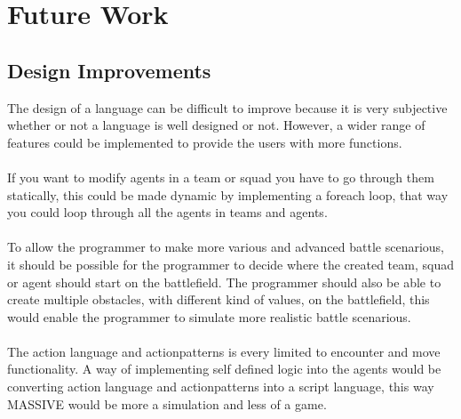 \section{Future Work}
\subsection{Design Improvements}
The design of a language can be difficult to improve because it is very subjective whether or not a language is well designed or not. However, a wider range of features could be implemented to provide the users with more functions.\\\\
\indent If you want to modify agents in a team or squad you have to go through them statically, this could be made dynamic by implementing a foreach loop, that way you could loop through all the agents in teams and agents.\\
\\
To allow the programmer to make more various and advanced battle scenarious, it should be possible for the programmer to decide where the created team, squad or agent should start on the battlefield. The programmer should also be able to create multiple obstacles, with different kind of values, on the battlefield, this would enable the programmer to simulate more realistic battle scenarious.\\
 \\
The action language and actionpatterns is every limited to encounter and move functionality. A way of implementing self defined logic into the agents would be converting action language and actionpatterns into a script language, this way MASSIVE would be more a simulation and less of a game.

